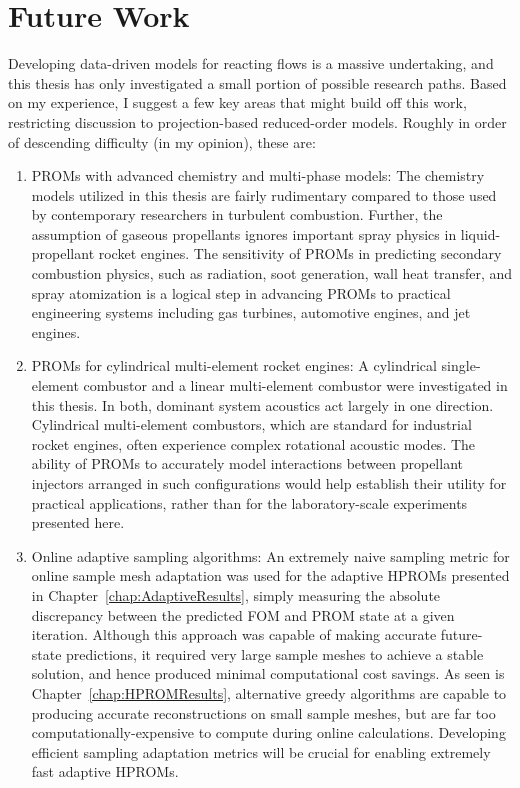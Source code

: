 \section{Future Work}

Developing data-driven models for reacting flows is a massive undertaking, and this thesis has only investigated a small portion of possible research paths. Based on my experience, I suggest a few key areas that might build off this work, restricting discussion to projection-based reduced-order models. Roughly in order of descending difficulty (in my opinion), these are:

\begin{enumerate}
    \item PROMs with advanced chemistry and multi-phase models: The chemistry models utilized in this thesis are fairly rudimentary compared to those used by contemporary researchers in turbulent combustion. Further, the assumption of gaseous propellants ignores important spray physics in liquid-propellant rocket engines. The sensitivity of PROMs in predicting secondary combustion physics, such as radiation, soot generation, wall heat transfer, and spray atomization is a logical step in advancing PROMs to practical engineering systems including gas turbines, automotive engines, and jet engines.
    \item PROMs for cylindrical multi-element rocket engines: A cylindrical single-element combustor and a linear multi-element combustor were investigated in this thesis. In both, dominant system acoustics act largely in one direction. Cylindrical multi-element combustors, which are standard for industrial rocket engines, often experience complex rotational acoustic modes. The ability of PROMs to accurately model interactions between propellant injectors arranged in such configurations would help establish their utility for practical applications, rather than for the laboratory-scale experiments presented here.
    \item Online adaptive sampling algorithms: An extremely naive sampling metric for online sample mesh adaptation was used for the adaptive HPROMs presented in Chapter~\ref{chap:AdaptiveResults}, simply measuring the absolute discrepancy between the predicted FOM and PROM state at a given iteration. Although this approach was capable of making accurate future-state predictions, it required very large sample meshes to achieve a stable solution, and hence produced minimal computational cost savings. As seen is Chapter~\ref{chap:HPROMResults}, alternative greedy algorithms are capable to producing accurate reconstructions on small sample meshes, but are far too computationally-expensive to compute during online calculations. Developing efficient sampling adaptation metrics will be crucial for enabling extremely fast adaptive HPROMs.

\end{enumerate}
